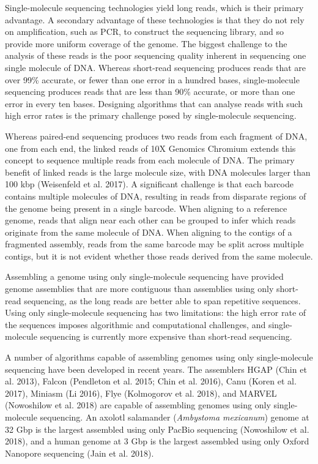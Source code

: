 \documentclass[
  12pt,
  oneside,
  openany]{book}
\begin{document}
Single-molecule sequencing technologies yield long reads, which is their primary advantage. A secondary advantage of these technologies is that they do not rely on amplification, such as PCR, to construct the sequencing library, and so provide more uniform coverage of the genome. The biggest challenge to the analysis of these reads is the poor sequencing quality inherent in sequencing one single molecule of DNA. Whereas short-read sequencing produces reads that are over 99\% accurate, or fewer than one error in a hundred bases, single-molecule sequencing produces reads that are less than 90\% accurate, or more than one error in every ten bases. Designing algorithms that can analyse reads with such high error rates is the primary challenge posed by single-molecule sequencing.

Whereas paired-end sequencing produces two reads from each fragment of DNA, one from each end, the linked reads of 10X Genomics Chromium extends this concept to sequence multiple reads from each molecule of DNA. The primary benefit of linked reads is the large molecule size, with DNA molecules larger than 100 kbp (Weisenfeld et al. 2017). A significant challenge is that each barcode contains multiple molecules of DNA, resulting in reads from disparate regions of the genome being present in a single barcode. When aligning to a reference genome, reads that align near each other can be grouped to infer which reads originate from the same molecule of DNA. When aligning to the contigs of a fragmented assembly, reads from the same barcode may be split across multiple contigs, but it is not evident whether those reads derived from the same molecule.

Assembling a genome using only single-molecule sequencing have provided genome assemblies that are more contiguous than assemblies using only short-read sequencing, as the long reads are better able to span repetitive sequences. Using only single-molecule sequencing has two limitations: the high error rate of the sequences imposes algorithmic and computational challenges, and single-molecule sequencing is currently more expensive than short-read sequencing.

A number of algorithms capable of assembling genomes using only single-molecule sequencing have been developed in recent years. The assemblers HGAP (Chin et al. 2013), Falcon (Pendleton et al. 2015; Chin et al. 2016), Canu (Koren et al. 2017), Miniasm (Li 2016), Flye (Kolmogorov et al. 2018), and MARVEL (Nowoshilow et al. 2018) are capable of assembling genomes using only single-molecule sequencing. An axolotl salamander (\emph{Ambystoma mexicanum}) genome at 32 Gbp is the largest assembled using only PacBio sequencing (Nowoshilow et al. 2018), and a human genome at 3 Gbp is the largest assembled using only Oxford Nanopore sequencing (Jain et al. 2018).
\end{document}
